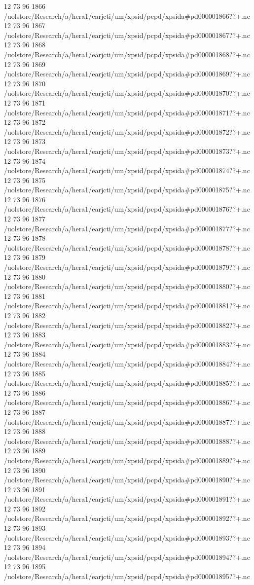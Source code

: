 12 73 96
1866
/uolstore/Research/a/hera1/earjcti/um/xpsid/pcpd/xpsida#pd000001866??+.nc
12 73 96
1867
/uolstore/Research/a/hera1/earjcti/um/xpsid/pcpd/xpsida#pd000001867??+.nc
12 73 96
1868
/uolstore/Research/a/hera1/earjcti/um/xpsid/pcpd/xpsida#pd000001868??+.nc
12 73 96
1869
/uolstore/Research/a/hera1/earjcti/um/xpsid/pcpd/xpsida#pd000001869??+.nc
12 73 96
1870
/uolstore/Research/a/hera1/earjcti/um/xpsid/pcpd/xpsida#pd000001870??+.nc
12 73 96
1871
/uolstore/Research/a/hera1/earjcti/um/xpsid/pcpd/xpsida#pd000001871??+.nc
12 73 96
1872
/uolstore/Research/a/hera1/earjcti/um/xpsid/pcpd/xpsida#pd000001872??+.nc
12 73 96
1873
/uolstore/Research/a/hera1/earjcti/um/xpsid/pcpd/xpsida#pd000001873??+.nc
12 73 96
1874
/uolstore/Research/a/hera1/earjcti/um/xpsid/pcpd/xpsida#pd000001874??+.nc
12 73 96
1875
/uolstore/Research/a/hera1/earjcti/um/xpsid/pcpd/xpsida#pd000001875??+.nc
12 73 96
1876
/uolstore/Research/a/hera1/earjcti/um/xpsid/pcpd/xpsida#pd000001876??+.nc
12 73 96
1877
/uolstore/Research/a/hera1/earjcti/um/xpsid/pcpd/xpsida#pd000001877??+.nc
12 73 96
1878
/uolstore/Research/a/hera1/earjcti/um/xpsid/pcpd/xpsida#pd000001878??+.nc
12 73 96
1879
/uolstore/Research/a/hera1/earjcti/um/xpsid/pcpd/xpsida#pd000001879??+.nc
12 73 96
1880
/uolstore/Research/a/hera1/earjcti/um/xpsid/pcpd/xpsida#pd000001880??+.nc
12 73 96
1881
/uolstore/Research/a/hera1/earjcti/um/xpsid/pcpd/xpsida#pd000001881??+.nc
12 73 96
1882
/uolstore/Research/a/hera1/earjcti/um/xpsid/pcpd/xpsida#pd000001882??+.nc
12 73 96
1883
/uolstore/Research/a/hera1/earjcti/um/xpsid/pcpd/xpsida#pd000001883??+.nc
12 73 96
1884
/uolstore/Research/a/hera1/earjcti/um/xpsid/pcpd/xpsida#pd000001884??+.nc
12 73 96
1885
/uolstore/Research/a/hera1/earjcti/um/xpsid/pcpd/xpsida#pd000001885??+.nc
12 73 96
1886
/uolstore/Research/a/hera1/earjcti/um/xpsid/pcpd/xpsida#pd000001886??+.nc
12 73 96
1887
/uolstore/Research/a/hera1/earjcti/um/xpsid/pcpd/xpsida#pd000001887??+.nc
12 73 96
1888
/uolstore/Research/a/hera1/earjcti/um/xpsid/pcpd/xpsida#pd000001888??+.nc
12 73 96
1889
/uolstore/Research/a/hera1/earjcti/um/xpsid/pcpd/xpsida#pd000001889??+.nc
12 73 96
1890
/uolstore/Research/a/hera1/earjcti/um/xpsid/pcpd/xpsida#pd000001890??+.nc
12 73 96
1891
/uolstore/Research/a/hera1/earjcti/um/xpsid/pcpd/xpsida#pd000001891??+.nc
12 73 96
1892
/uolstore/Research/a/hera1/earjcti/um/xpsid/pcpd/xpsida#pd000001892??+.nc
12 73 96
1893
/uolstore/Research/a/hera1/earjcti/um/xpsid/pcpd/xpsida#pd000001893??+.nc
12 73 96
1894
/uolstore/Research/a/hera1/earjcti/um/xpsid/pcpd/xpsida#pd000001894??+.nc
12 73 96
1895
/uolstore/Research/a/hera1/earjcti/um/xpsid/pcpd/xpsida#pd000001895??+.nc
